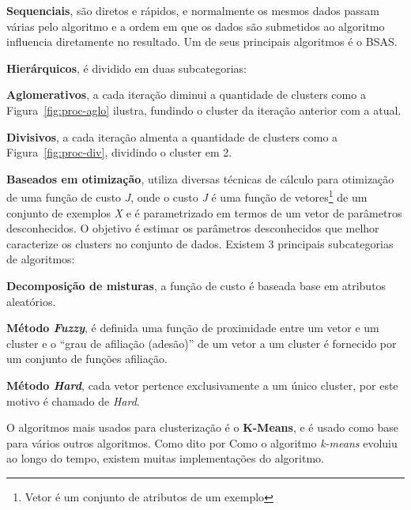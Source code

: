 \begin{alineas}
	\item \textbf{Sequenciais}, são diretos e rápidos, e normalmente os mesmos dados passam várias pelo algoritmo e a ordem em que os 
	dados são submetidos ao algoritmo influencia diretamente no resultado. Um de seus principais algoritmos é o BSAS.  
	
	\item \textbf{Hierárquicos},  é dividido em duas subcategorias:
		\begin{alineas}
			\item \textbf{Aglomerativos}, a cada iteração diminui a quantidade de clusters como a Figura~\ref{fig:proc-aglo} ilustra, fundindo o cluster da iteração anterior com a atual. 
			\item \textbf{Divisivos}, a cada iteração almenta a quantidade de clusters como a Figura~\ref{fig:proc-div}, dividindo o cluster em 2. 
		\end{alineas} 	
	\item \textbf{Baseados em otimização}, utiliza diversas técnicas de cálculo para otimização de uma função de custo \textit{J}, 
	onde o custo \textit{J} é uma função de vetores\footnote{Vetor é um conjunto de atributos de um exemplo} de um conjunto de exemplos \textit{X} e é parametrizado em termos de um 
	vetor de parâmetros desconhecidos. O objetivo é estimar os parâmetros desconhecidos que melhor caracterize os clusters no
	conjunto de dados. Existem 3 principais subcategorias de algoritmos:  
	\begin{alineas}
		\item \textbf{Decomposição de misturas}, a função de custo é baseada base em atributos aleatórios.
		
		\item \textbf{Método \textit{Fuzzy}}, é definida uma função de proximidade entre um vetor e um cluster e o
		 “grau de afiliação (adesão)” de um vetor a um cluster é fornecido por um conjunto de funções afiliação.	
		
		\item \textbf{Método \textit{Hard}}, cada vetor pertence exclusivamente a um único cluster, por este motivo é chamado de \textit{Hard}.		 	
	\end{alineas} 		
\end{alineas}   

O algoritmos mais usados para clusterização é o \textbf{K-Means}, e é usado como base para vários outros algoritmos.
Como dito por \cite{k-means}Como o algoritmo \textit{k-means} evoluiu ao longo do tempo, existem muitas implementações do algoritmo.
 
